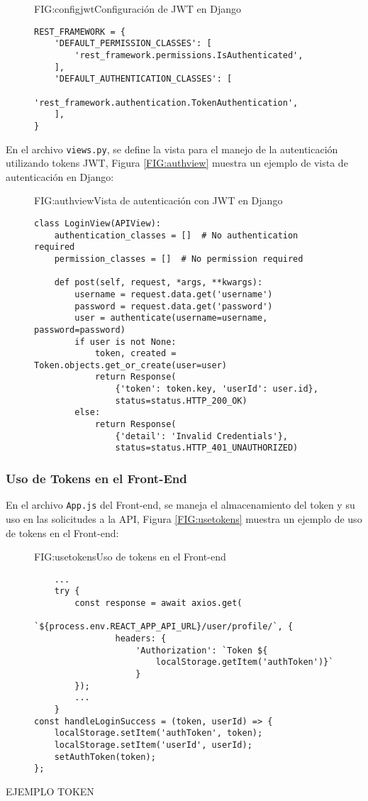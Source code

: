 \begin{figure}[Configuración JWT]{FIG:configjwt}{Configuración de JWT en Django}
\begin{verbatim}
REST_FRAMEWORK = {
    'DEFAULT_PERMISSION_CLASSES': [
        'rest_framework.permissions.IsAuthenticated',
    ],
    'DEFAULT_AUTHENTICATION_CLASSES': [
        'rest_framework.authentication.TokenAuthentication',
    ],
}
\end{verbatim}
\end{figure}

En el archivo \texttt{views.py}, se define la vista para el manejo de la autenticación utilizando tokens JWT, Figura \ref{FIG:authview} muestra un ejemplo de vista de autenticación en Django:

\begin{figure}[Vista Autenticación]{FIG:authview}{Vista de autenticación con JWT en Django}
\begin{verbatim}
class LoginView(APIView):
    authentication_classes = []  # No authentication required
    permission_classes = []  # No permission required

    def post(self, request, *args, **kwargs):
        username = request.data.get('username')
        password = request.data.get('password')
        user = authenticate(username=username, password=password)
        if user is not None:
            token, created = Token.objects.get_or_create(user=user)
            return Response(
                {'token': token.key, 'userId': user.id}, 
                status=status.HTTP_200_OK)
        else:
            return Response(
                {'detail': 'Invalid Credentials'}, 
                status=status.HTTP_401_UNAUTHORIZED)
\end{verbatim}
\end{figure}

\subsubsection{Uso de Tokens en el Front-End}

En el archivo \texttt{App.js} del Front-end, se maneja el almacenamiento del token y su uso en las solicitudes a la API, Figura \ref{FIG:usetokens} muestra un ejemplo de uso de tokens en el Front-end:

\begin{figure}[Uso de Tokens]{FIG:usetokens}{Uso de tokens en el Front-end}
\begin{verbatim}
    ...
    try {
        const response = await axios.get(
            `${process.env.REACT_APP_API_URL}/user/profile/`, {
                headers: { 
                    'Authorization': `Token ${
                        localStorage.getItem('authToken')}` 
                    }
        });
        ...
    }
const handleLoginSuccess = (token, userId) => {
    localStorage.setItem('authToken', token);
    localStorage.setItem('userId', userId);
    setAuthToken(token);
};
\end{verbatim}
\end{figure}

EJEMPLO TOKEN